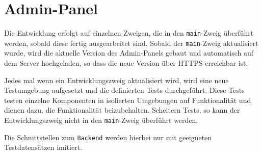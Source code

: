 \section{Admin-Panel}

Die Entwicklung erfolgt auf einzelnen Zweigen, die in den \verb#main#-Zweig überführt werden, sobald diese fertig ausgearbeitet sind.
Sobald der \verb#main#-Zweig aktualisiert wurde, wird die aktuelle Version des Admin-Panels gebaut und automatisch auf dem Server hochgeladen,
so dass die neue Version über HTTPS erreichbar ist.

Jedes mal wenn ein Entwicklungszweig aktualisiert wird, wird eine neue Testumgebung aufgesetzt und die definierten Tests durchgeführt.
Diese Tests testen einzelne Komponenten in isolierten Umgebungen auf Funktionalität und dienen dazu, die Funktionalität beizubehalten.
Scheitern Tests, so kann der Entwicklungszweig nicht in den \verb#main#-Zweig überführt werden.

Die Schnittstellen zum \verb#Backend# werden hierbei nur mit geeigneten Testdatensätzen imitiert.
